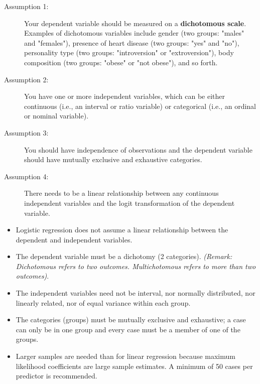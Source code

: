 \documentclass[a4paper,12pt]{article}
\begin{document}
	
	\begin{description}
		\item[Assumption 1:] Your dependent variable should be measured on a \textbf{dichotomous scale}. Examples of dichotomous variables include gender (two groups: "males" and "females"), presence of heart disease (two groups: "yes" and "no"), personality type (two groups: "introversion" or "extroversion"), body composition (two groups: "obese" or "not obese"), and so forth. \\
		\newline
		
		
		\item[Assumption 2:] You have one or more independent variables, which can be either continuous (i.e., an interval or ratio variable) or categorical (i.e., an ordinal or nominal variable). 
		
		
		
		\item[Assumption 3:] You should have independence of observations and the dependent variable should have mutually exclusive and exhaustive categories.
		
		\item[Assumption 4:] There needs to be a linear relationship between any continuous independent variables and the logit transformation of the dependent variable. 
	\end{description}
\begin{itemize}
	\item Logistic regression does not assume a linear relationship between the dependent and
	independent variables.
	\item The dependent variable must be a dichotomy (2 categories).
	\textit{(Remark: Dichotomous refers to two outcomes. Multichotomous refers to more than two outcomes)}.
	\item The independent variables need not be interval, nor normally distributed, nor linearly
	related, nor of equal variance within each group.
	\item The categories (groups) must be mutually exclusive and exhaustive; a case can only be
	in one group and every case must be a member of one of the groups.
	\item Larger samples are needed than for linear regression because maximum likelihood
	coefficients are large sample estimates. A minimum of 50 cases per predictor is
	recommended.
\end{itemize}	
\end{document}
